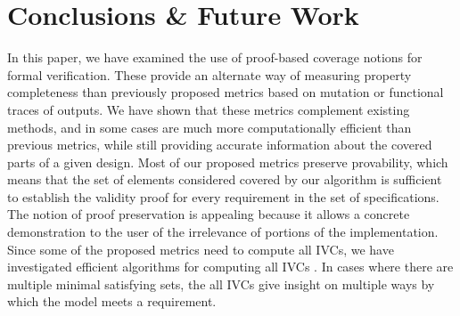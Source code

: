 \section{Conclusions \& Future Work}
\label{sec:conclusion}

In this paper, we have examined the use of proof-based coverage notions for formal verification.  These provide an alternate way of measuring property completeness than previously proposed metrics based on mutation or functional traces of outputs.
We have shown that these metrics complement existing methods, and in some cases are much more computationally efficient than previous metrics, while still providing accurate information about the covered parts of a given design.
Most of our proposed metrics preserve provability, which means that the set of elements considered covered by our algorithm is sufficient to establish the validity proof for every requirement in the set of specifications.  
The notion of proof preservation is appealing because it allows a concrete demonstration to the user of the irrelevance of portions of the implementation. Since some of the proposed metrics need to compute all IVCs,
we have investigated efficient algorithms for computing all IVCs \cite{Ghass17}. In cases where there are multiple minimal satisfying sets, the all IVCs give insight on multiple ways by which the model meets a requirement.


